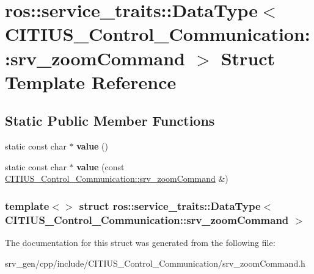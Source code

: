\hypertarget{structros_1_1service__traits_1_1_data_type_3_01_c_i_t_i_u_s___control___communication_1_1srv__zoom_command_01_4}{\section{ros\-:\-:service\-\_\-traits\-:\-:\-Data\-Type$<$ \-C\-I\-T\-I\-U\-S\-\_\-\-Control\-\_\-\-Communication\-:\-:srv\-\_\-zoom\-Command $>$ \-Struct \-Template \-Reference}
\label{structros_1_1service__traits_1_1_data_type_3_01_c_i_t_i_u_s___control___communication_1_1srv__zoom_command_01_4}
}
\subsection*{\-Static \-Public \-Member \-Functions}
\begin{DoxyCompactItemize}
\item 
\hypertarget{structros_1_1service__traits_1_1_data_type_3_01_c_i_t_i_u_s___control___communication_1_1srv__zoom_command_01_4_a6971c4d6c1a08fe72c3dfed7e6d5bc77}{static const char $\ast$ {\bfseries value} ()}\label{structros_1_1service__traits_1_1_data_type_3_01_c_i_t_i_u_s___control___communication_1_1srv__zoom_command_01_4_a6971c4d6c1a08fe72c3dfed7e6d5bc77}

\item 
\hypertarget{structros_1_1service__traits_1_1_data_type_3_01_c_i_t_i_u_s___control___communication_1_1srv__zoom_command_01_4_a20a1b0114928ea9a6bc8cbc5fc500f3c}{static const char $\ast$ {\bfseries value} (const \hyperlink{struct_c_i_t_i_u_s___control___communication_1_1srv__zoom_command}{\-C\-I\-T\-I\-U\-S\-\_\-\-Control\-\_\-\-Communication\-::srv\-\_\-zoom\-Command} \&)}\label{structros_1_1service__traits_1_1_data_type_3_01_c_i_t_i_u_s___control___communication_1_1srv__zoom_command_01_4_a20a1b0114928ea9a6bc8cbc5fc500f3c}

\end{DoxyCompactItemize}
\subsubsection*{template$<$$>$ struct ros\-::service\-\_\-traits\-::\-Data\-Type$<$ C\-I\-T\-I\-U\-S\-\_\-\-Control\-\_\-\-Communication\-::srv\-\_\-zoom\-Command $>$}



\-The documentation for this struct was generated from the following file\-:\begin{DoxyCompactItemize}
\item 
srv\-\_\-gen/cpp/include/\-C\-I\-T\-I\-U\-S\-\_\-\-Control\-\_\-\-Communication/srv\-\_\-zoom\-Command.\-h\end{DoxyCompactItemize}
